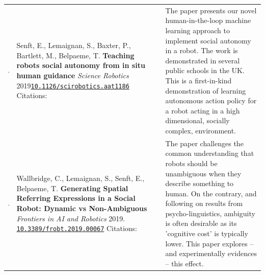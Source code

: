 \documentclass[11pt]{report}
\begin{document}
\begin{tabular}{p{1.8cm}p{6cm}p{7cm}}

    \vspace{0cm}\includegraphics[width=2cm]{thumbs/2019-science.jpg} & Senft, E.,
    Lemaignan, S., Baxter, P., Bartlett, M., Belpaeme, T.
    \textbf{Teaching robots social autonomy from in situ human guidance}
    \newline \textit{Science Robotics} 2019\newline \texttt{\href{https://doi.org/10.1126/scirobotics.aat1186}{10.1126/scirobotics.aat1186}}
    \newline Citations: 
    & \small The paper presents our novel human-in-the-loop machine learning approach
    to implement social autonomy in a robot. The work is demonstrated in several
    public schools in the UK. This is a first-in-kind demonstration of learning
    autonomous action policy for a robot acting in a high dimensional, socially complex,
    environment. \\


    \vspace{0cm}\includegraphics[width=2cm]{thumbs/2019-science.jpg} &

    Wallbridge, C., Lemaignan, S., Senft, E., Belpaeme, T.  \textbf{Generating
    Spatial Referring Expressions in a Social Robot: Dynamic vs Non-Ambiguous} 
    \newline \textit{Frontiers in AI and Robotics} 2019.
    \newline \texttt{\href{https://doi.org/10.3389/frobt.2019.00067}{10.3389/frobt.2019.00067}}
    \newline Citations: 

    & \small The paper challenges the common understanding that robots should be
    unambiguous when they describe something to human. On the contrary, and
    following on results from psycho-linguistics, ambiguity is often desirable
    as its 'cognitive cost' is typically lower. This paper explores -- and
    experimentally evidences -- this effect. \\


\end{tabular}
\end{document}
